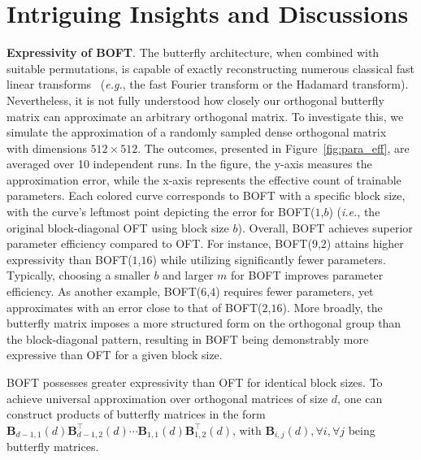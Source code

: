 \section{Intriguing Insights and Discussions}

\textbf{Expressivity of BOFT}. The butterfly architecture, when combined with suitable permutations, is capable of exactly reconstructing numerous classical fast linear transforms~\cite{dao2019learning,dao2019kaleidoscope} (\emph{e.g.}, the fast Fourier transform or the Hadamard transform). Nevertheless, it is not fully understood how closely our orthogonal butterfly matrix can approximate an arbitrary orthogonal matrix. To investigate this, we simulate the approximation of a randomly sampled dense orthogonal matrix~\cite{anderson1987generation} with dimensions $512\times 512$. The outcomes, presented in Figure~\ref{fig:para_eff}, are averaged over 10 independent runs. In the figure, the y-axis measures the approximation error, while the x-axis represents the effective count of trainable parameters. Each colored curve corresponds to BOFT with a specific block size, with the curve’s leftmost point depicting the error for BOFT($1$,$b$) (\emph{i.e.}, the original block-diagonal OFT using block size $b$). Overall, BOFT achieves superior parameter efficiency compared to OFT. For instance, BOFT($9$,$2$) attains higher expressivity than BOFT($1$,$16$) while utilizing significantly fewer parameters. Typically, choosing a smaller $b$ and larger $m$ for BOFT improves parameter efficiency. As another example, BOFT($6$,$4$) requires fewer parameters, yet approximates with an error close to that of BOFT($2$,$16$). More broadly, the butterfly matrix imposes a more structured form on the orthogonal group than the block-diagonal pattern, resulting in BOFT being demonstrably more expressive than OFT for a given block size.

\begin{theorem}\label{thm:exp_boft}
    BOFT possesses greater expressivity than OFT for identical block sizes. To achieve universal approximation over orthogonal matrices of size $d$, one can construct products of butterfly matrices in the form $\bm{B}_{d-1,1}(d)\bm{B}^\top_{d-1,2}(d)\cdots\bm{B}_{1,1}(d)\bm{B}^\top_{1,2}(d)$, with $\bm{B}_{i,j}(d), \forall i,\forall j$ being butterfly matrices.
\end{theorem}


